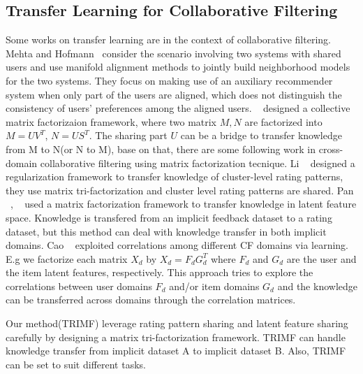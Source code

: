 \subsection{Transfer Learning for Collaborative Filtering}
Some works on transfer learning are in the context of collaborative filtering.
Mehta and Hofmann~\cite{/ki/bhaskar06cross} consider the scenario involving two systems with shared users and use manifold alignment methods to jointly build neighborhood models for the two systems. They focus on making use of an auxiliary recommender system when only part of the users are aligned, which does not distinguish the consistency of users' preferences among the aligned users.
~\cite{/kdd/SinghG08} designed a collective matrix factorizaion framework, where two matrix $M, N$ are factorized into $M = UV^T$, $N = US^T$. The sharing part $U$ can be a bridge to transfer knowledge from M to N(or N to M), base on that, there are some following work in cross-domain collaborative filtering using matrix factorization tecnique.
Li \etal~\cite{/icml/libin09} designed a regularization framework to transfer knowledge of cluster-level rating patterns, they use matrix tri-factorization and cluster level rating patterns are shared.
Pan \etal~\cite{/ijcai/PanLXY11}, ~\cite{AAAI101649} used a matrix factorization framework to transfer knowledge in latent feature space. Knowledge is transfered from an implicit feedback dataset to a rating dataset, but this method can deal with knowledge transfer in both implicit domains.
Cao \etal~\cite{cao2010transfer} exploited correlations among different CF domains via learning. E.g we factorize each matrix $X_d$ by $X_d = F_d G_d^T$ where $F_d$ and $G_d$ are the user and the item latent features, respectively. This approach tries to explore the correlations between user domains {$F_d$} and/or item domains {$G_d$} and the knowledge can be
transferred across domains through the correlation matrices.

Our method(TRIMF) leverage rating pattern sharing and latent feature sharing carefully by designing a matrix tri-factorization framework. TRIMF can handle knowledge transfer from implicit dataset A to implicit dataset B. Also, TRIMF can be set to suit different tasks.

\hspace{0.05in}
